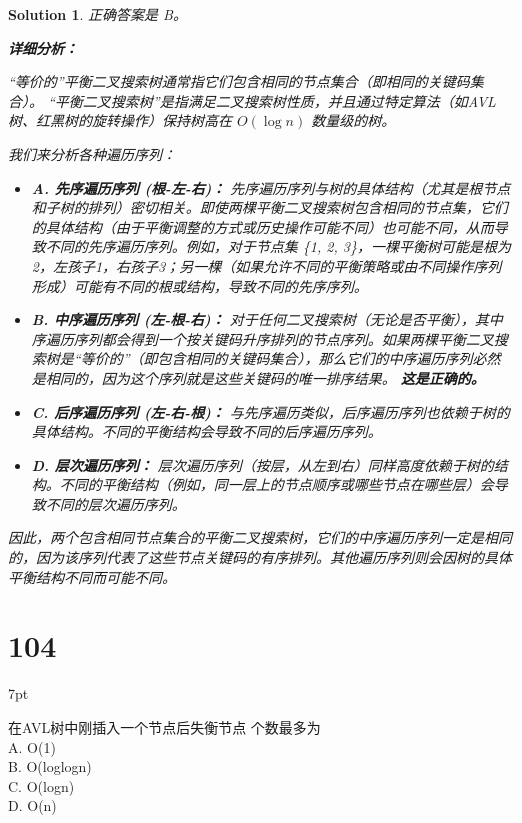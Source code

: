 \documentclass[UTF8]{report}
\newtheorem{solution}{Solution}
\theoremstyle{MyLineTheoremStyle} %
\theoremstyle{MyBlockTheoremStyle} %
\theoremstyle{MySubsubsectionStyle} %
\newenvironment{graybox}{%
        \def\FrameCommand{%
        \hspace{1pt}%
        {\color{gray}\small \vrule width 2pt}%
        {\color{graybox_color}\vrule width 4pt}%
        \colorbox{graybox_color}%
        }%
        \MakeFramed{\advance\hsize-\width\FrameRestore}%
        \noindent\hspace{-4.55pt}%
        \begin{adjustwidth}{}{7pt}%
        \vspace{2pt}\vspace{2pt}%
        }
        {%
        \vspace{2pt}\end{adjustwidth}\endMakeFramed%
        }
\begin{document}
\begin{solution}
正确答案是 B。

\textbf{详细分析：}

“等价的”平衡二叉搜索树通常指它们包含相同的节点集合（即相同的关键码集合）。
“平衡二叉搜索树”是指满足二叉搜索树性质，并且通过特定算法（如AVL树、红黑树的旋转操作）保持树高在 $O(\log n)$ 数量级的树。

我们来分析各种遍历序列：
\begin{itemize}
    \item \textbf{A. 先序遍历序列 (根-左-右)：}
        先序遍历序列与树的具体结构（尤其是根节点和子树的排列）密切相关。即使两棵平衡二叉搜索树包含相同的节点集，它们的具体结构（由于平衡调整的方式或历史操作可能不同）也可能不同，从而导致不同的先序遍历序列。例如，对于节点集 \{1, 2, 3\}，一棵平衡树可能是根为2，左孩子1，右孩子3；另一棵（如果允许不同的平衡策略或由不同操作序列形成）可能有不同的根或结构，导致不同的先序序列。

    \item \textbf{B. 中序遍历序列 (左-根-右)：}
        对于任何二叉搜索树（无论是否平衡），其中序遍历序列都会得到一个按关键码升序排列的节点序列。如果两棵平衡二叉搜索树是“等价的”（即包含相同的关键码集合），那么它们的中序遍历序列必然是相同的，因为这个序列就是这些关键码的唯一排序结果。
        \textbf{这是正确的。}

    \item \textbf{C. 后序遍历序列 (左-右-根)：}
        与先序遍历类似，后序遍历序列也依赖于树的具体结构。不同的平衡结构会导致不同的后序遍历序列。

    \item \textbf{D. 层次遍历序列：}
        层次遍历序列（按层，从左到右）同样高度依赖于树的结构。不同的平衡结构（例如，同一层上的节点顺序或哪些节点在哪些层）会导致不同的层次遍历序列。
\end{itemize}

因此，两个包含相同节点集合的平衡二叉搜索树，它们的中序遍历序列一定是相同的，因为该序列代表了这些节点关键码的有序排列。其他遍历序列则会因树的具体平衡结构不同而可能不同。
\end{solution}



\section*{104}
\begin{graybox}
在AVL树中刚插入一个节点后失衡节点
个数最多为 \\
A. O(1) \\
B. O(loglogn) \\
C. O(logn) \\
D. O(n)
\end{graybox}
\end{document}
